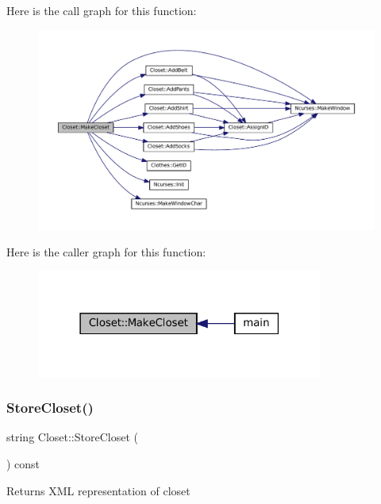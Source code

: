 Here is the call graph for this function\+:\nopagebreak
\begin{figure}[H]
\begin{center}
\leavevmode
\includegraphics[width=350pt]{classCloset_a1b904dfcdafe293f3f530b338afc0601_cgraph}
\end{center}
\end{figure}
Here is the caller graph for this function\+:\nopagebreak
\begin{figure}[H]
\begin{center}
\leavevmode
\includegraphics[width=267pt]{classCloset_a1b904dfcdafe293f3f530b338afc0601_icgraph}
\end{center}
\end{figure}
\mbox{\label{classCloset_a1f2ec8e3e912756e35fdc55c9401ea3e}} 
\subsubsection{\texorpdfstring{Store\+Closet()}{StoreCloset()}}
{\footnotesize\ttfamily string Closet\+::\+Store\+Closet (\begin{DoxyParamCaption}{ }\end{DoxyParamCaption}) const}

\begin{DoxyReturn}{Returns}
X\+ML representation of closet 
\end{DoxyReturn}


